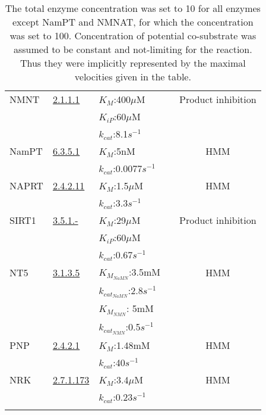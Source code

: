 \documentclass[a4paper,10pt]{article}
\begin{document}
\begin{longtable}{p{2cm}p{2cm}p{2cm}cc}
    \\ \hline
NMNT & \href{http://www.chem.qmul.ac.uk/iubmb/enzyme/EC2/1/1/1.html}{2.1.1.1}
&$K_M$:400$\mu$M  & \cite{Aksoy1994} & Product inhibition\\
& & $K_{iP}$:60$\mu$M  & &
    \\
    & & $k_{cat}$:8.1$s^{-1}$  & \cite{Alston1988}&
    \\  \hline
NamPT & \href{http://www.chem.qmul.ac.uk/iubmb/enzyme/EC6/3/5/1.html}{6.3.5.1}
&$K_M$:5nM  & \cite{Burgos2008} & HMM\\
    & & $k_{cat}$:0.0077$s^{-1}$  & &
    \\  \hline
    NAPRT &
       \href{http://www.chem.qmul.ac.uk/iubmb/enzyme/EC2/4/2/11.html}{2.4.2.11}
    &$K_M$:1.5$\mu$M  & \cite{Burgos2008} & HMM\\
    & & $k_{cat}$:3.3$s^{-1}$  & &
    \\  \hline
    SIRT1 &
    \href{http://www.chem.qmul.ac.uk/iubmb/enzyme/EC3/5/1/index.html}{3.5.1.-}
    &$K_M$:29$\mu$M  & \cite{Borra2004} & Product inhibition\\
    & & $K_{iP}$:60$\mu$M  & &
    \\
    & & $k_{cat}$:0.67$s^{-1}$  & &
    \\  \hline
    NT5 &
    \href{http://www.chem.qmul.ac.uk/iubmb/enzyme/EC3/1/3/5.html}{3.1.3.5}
    &$K_{M_{NaMN}}$:3.5mM  & \cite{Kulikova2015} & HMM \\
    & & $k_{{cat}_{NaMN}}$:2.8$s^{-1}$
    & & \\
    & &$K_{M_{NMN}}$: 5mM   &  \\
     & & $k_{{cat}_{NMN}}$:0.5$s^{-1}$
     & & \\  \hline
     PNP &
    \href{http://www.chem.qmul.ac.uk/iubmb/enzyme/EC3/2/4/2.html}{2.4.2.1}
    &$K_M$:1.48mM  & \cite{Wielgus-Kutrowska1997} & HMM \\
    & & $k_{cat}$:40$s^{-1}$
    & & \\  \hline
    NRK &
    \href{http://www.chem.qmul.ac.uk/iubmb/enzyme/EC2/7/1/173.html}{2.7.1.173}
    &$K_M$:3.4$\mu$M & \cite{Dolle2009} & HMM \\
    & & $k_{cat}$:0.23$s^{-1}$
    & & \\  \hline
  \bottomrule
   \caption{The total enzyme concentration was set to 10 for all enzymes except NamPT and NMNAT, for which the concentration was set to 100. Concentration of potential co-substrate was assumed to be constant and not-limiting for the reaction. Thus they were implicitly represented by the
maximal velocities given in the table.}
  \label{tab:kinetic}

\end{longtable}
\end{document}

